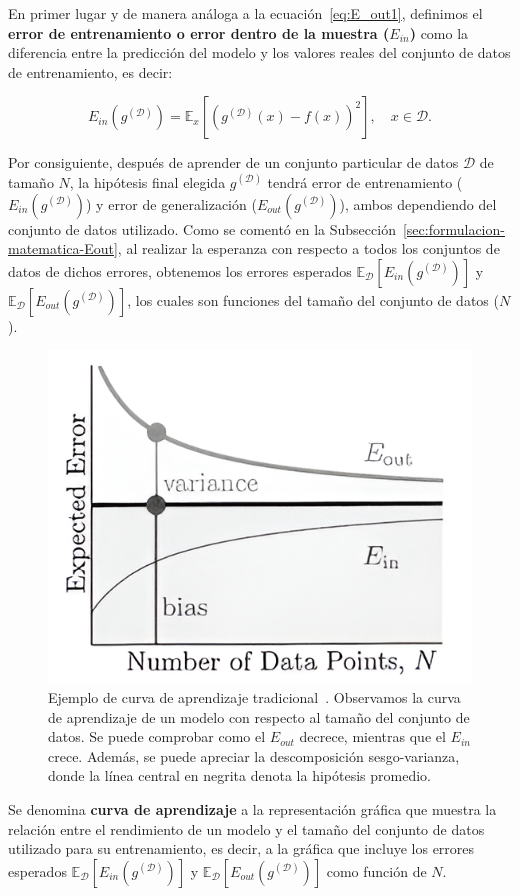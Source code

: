 En primer lugar y de manera análoga a la ecuación~\eqref{eq:E_out1}, definimos el \textbf{error de entrenamiento o error dentro de la muestra ($E_{in}$)} como la diferencia entre la predicción del modelo y los valores reales del conjunto de datos de entrenamiento, es decir:

\begin{equation}\label{eq:E_in1}
    E_{in}(g^{\mathcal{(D)}}) = \mathbb{E}_{x}[{(g^{\mathcal{(D)}}(x) - f(x))}^2], \quad x \in \mathcal{D}.
\end{equation}

Por consiguiente, después de aprender de un conjunto particular de datos $\mathcal{D}$ de tamaño $N$, la hipótesis final elegida $g^{(\mathcal{D})}$ tendrá error de entrenamiento ($E_{in}(g^{(\mathcal{D})})$) y error de generalización ($E_{out}(g^{(\mathcal{D})})$), ambos dependiendo del conjunto de datos utilizado. Como se comentó en la Subsección~\ref{sec:formulacion-matematica-Eout}, al realizar la esperanza con respecto a todos los conjuntos de datos de dichos errores, obtenemos los errores esperados $\mathbb{E}_{\mathcal{D}}[E_{in}(g^{(\mathcal{D})})]$ y $\mathbb{E}_{\mathcal{D}}[E_{out}(g^{(\mathcal{D})})]$, los cuales son funciones del tamaño del conjunto de datos ($N$).

\begin{figure}[h]
    \centering
    \includegraphics[width=0.4\linewidth]{img/learning-curve.png}
    \caption[Ejemplo de curva de aprendizaje tradicional~\cite{Mostafa2012}.] {Ejemplo de curva de aprendizaje tradicional~\cite{Mostafa2012}. Observamos la curva de aprendizaje de un modelo con respecto al tamaño del conjunto de datos. Se puede comprobar como el $E_{out}$ decrece, mientras que el $E_{in}$ crece. Además, se puede apreciar la descomposición sesgo-varianza, donde la línea central en negrita denota la hipótesis promedio.}\label{fig:learning-curve-bias-variance}
\end{figure}

Se denomina \textbf{curva de aprendizaje} a la representación gráfica que muestra la relación entre el rendimiento de un modelo y el tamaño del conjunto de datos utilizado para su entrenamiento, es decir, a la gráfica que incluye los errores esperados $\mathbb{E}_{\mathcal{D}}[E_{in}(g^{(\mathcal{D})})]$ y $\mathbb{E}_{\mathcal{D}}[E_{out}(g^{(\mathcal{D})})]$ como función de $N$.

